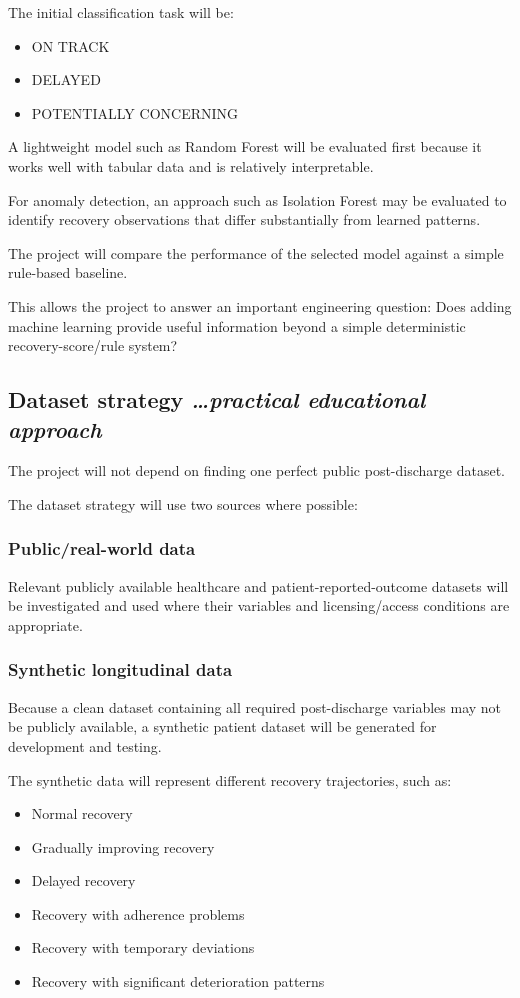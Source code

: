 \documentclass[11pt,a4paper]{article}
\newcommand{\BvrHint}[1]{%
  {\normalfont\normalsize\itshape\hfill #1}}
\begin{document}
The initial classification task will be:
\begin{itemize}[leftmargin=0.7cm]
    \item ON TRACK
    \item DELAYED
    \item POTENTIALLY CONCERNING
\end{itemize}

A lightweight model such as Random Forest will be
evaluated first because it works well with tabular data and is relatively
interpretable.

For anomaly detection, an approach such as Isolation
Forest may be evaluated to identify recovery observations that differ
substantially from learned patterns.

The project will compare the performance of the selected
model against a simple rule-based baseline.

This allows the project to answer an important engineering
question: Does adding machine learning provide useful information
beyond a simple deterministic recovery-score/rule system?

\subsection{Dataset strategy %
\BvrHint{\ldots practical educational approach}}

The project will not depend on finding one perfect public
post-discharge dataset.

The dataset strategy will use two sources where possible:

\subsubsection{Public/real-world data}

Relevant publicly available healthcare and
patient-reported-outcome datasets will be investigated and used where their
variables and licensing/access conditions are appropriate.

\subsubsection{Synthetic longitudinal data}

Because a clean dataset containing all required
post-discharge variables may not be publicly available, a synthetic patient
dataset will be generated for development and testing.

The synthetic data will represent different recovery
trajectories, such as:
\begin{itemize}[leftmargin=0.7cm]
    \item Normal recovery
    \item Gradually improving recovery
    \item Delayed recovery
    \item Recovery with adherence problems
    \item Recovery with temporary deviations
    \item Recovery with significant deterioration patterns
\end{itemize}
\end{document}
